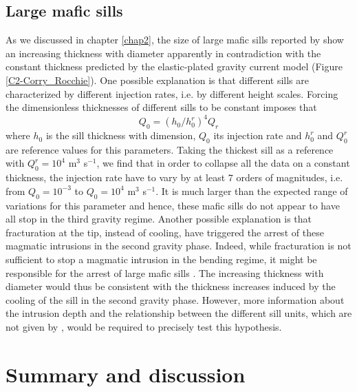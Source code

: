 \subsection{Large mafic sills}
\label{sec:large-mafic-sill}

As we discussed in chapter \ref{chap2},  the size of large mafic sills
reported  by  \citet{Cruden:tg}  show  an  increasing  thickness  with
diameter  apparently  in  contradiction with  the  constant  thickness
predicted  by   the  elastic-plated  gravity  current   model  (Figure
\ref{C2-Corry_Rocchie}).  One  possible explanation is  that different
sills  are  characterized  by  different  injection  rates,  i.e.   by
different  height scales.   Forcing the  dimensionless thicknesses  of
different sills to be constant imposes that
\begin{equation}
  Q_0 = (h_0/h_0^r)^4Q_r
\end{equation}
where $h_0$ is the sill  thickness with dimension, $Q_0$ its injection
rate and $h_0^r$ and $Q_0^r$ are reference values for this parameters.
Taking the  thickest sill  as a  reference with  $Q_0^r =  10^4$ m$^3$
s$^{-1}$, we find that in order to collapse all the data on a constant
thickness, the injection  rate have to vary by at  least $7$ orders of
magnitudes,   i.e.   from   $Q_0=10^{-3}$  to   $Q_0=  10^{4}$   m$^3$
s$^{-1}$. It is much larger than  the expected range of variations for
this parameter and hence, these mafic  sills do not appear to have all
stop in the third gravity regime. Another possible explanation is that
fracturation at the tip, instead of cooling, have triggered the arrest
of these  magmatic intrusions  in the  second gravity  phase.  Indeed,
while fracturation is  not sufficient to stop a  magmatic intrusion in
the bending  regime, it might be  responsible for the arrest  of large
mafic  sills \citep{Michaut:2011kg}.   The  increasing thickness  with
diameter would thus be consistent with the thickness increases induced
by the cooling of the sill in the second gravity phase.  However, more
information about the intrusion depth and the relationship between the
different sill units, which are  not given by \citet{Cruden:tg}, would
be required to precisely test this hypothesis.

\section{Summary and discussion}
\label{sec:discussion}

